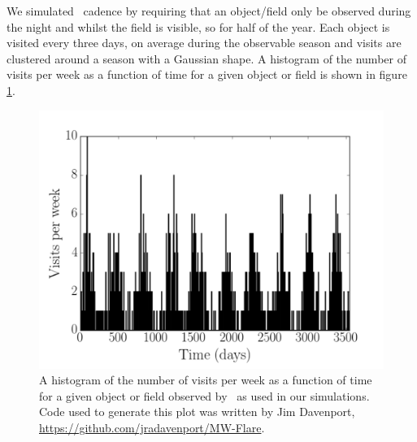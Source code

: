 We simulated \LSST\ cadence by requiring that an object/field only be observed
during the night and whilst the field is visible, so for half of the year.
Each object is visited every three days, on average during the observable
season and visits are clustered around a season with a Gaussian shape.
A histogram of the number of visits per week as a function of time for a given
object or field is shown in figure \ref{fig:cadence_hist}.

\begin{figure}
\begin{center}
\includegraphics[width=6in, clip=true]{figures/cadence_hist}
\caption[An \LSST\ cadence histogram.]
{A histogram of the number of visits per week as a function of time
for a given object or field observed by \LSST\ as used in our simulations.
Code used to generate this plot was written by Jim Davenport,
\url{https://github.com/jradavenport/MW-Flare}.}
\label{fig:cadence_hist}
\end{center}
\end{figure}

